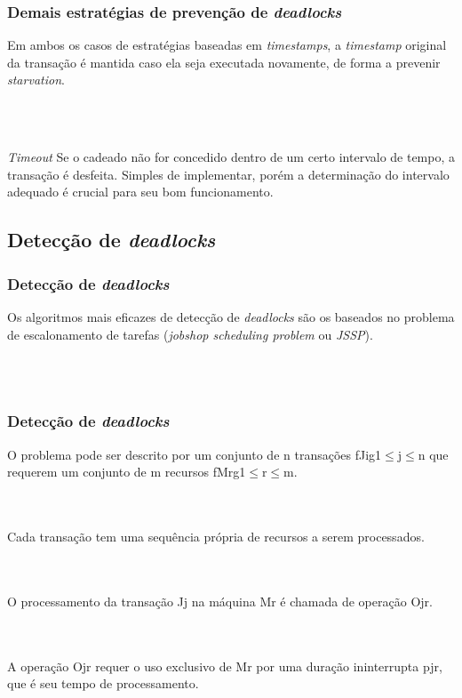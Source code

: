\documentclass{beamer}
\begin{document}

\begin{frame}
    \frametitle{Demais estratégias de prevenção de \emph{deadlocks}}

    Em ambos os casos de estratégias baseadas em \emph{timestamps}, a \emph{timestamp} original da transação é mantida caso ela seja executada novamente, de forma a prevenir \emph{starvation}.

    \\~\\
    \begin{block}{\emph{Timeout}}
        Se o cadeado não for concedido dentro de um certo intervalo de tempo, a transação é desfeita. Simples de implementar, porém a determinação do intervalo adequado é crucial para seu bom funcionamento.
    \end{block}
    
\end{frame}



\subsection{Detecção de \emph{deadlocks}}
\begin{frame}
    \frametitle{Detecção de \emph{deadlocks}}

    Os algoritmos mais eficazes de detecção de \emph{deadlocks} são os baseados no problema de escalonamento de tarefas (\emph{jobshop scheduling problem} ou \emph{JSSP}).

    \\~\\
\end{frame}

\begin{frame}
    \frametitle{Detecção de \emph{deadlocks}}

    O problema pode ser descrito por um conjunto de n transações fJig1$\leq$j$\leq$n que requerem um conjunto de m recursos fMrg1$\leq$r$\leq$m.

    \\~\\
    Cada transação tem uma sequência própria de recursos a serem processados.

    \\~\\
    O processamento da transação Jj na máquina Mr é chamada de operação Ojr.

    \\~\\
    A operação Ojr requer o uso exclusivo de Mr por uma duração ininterrupta pjr, que é seu tempo de processamento.

\end{frame}
\end{document}
